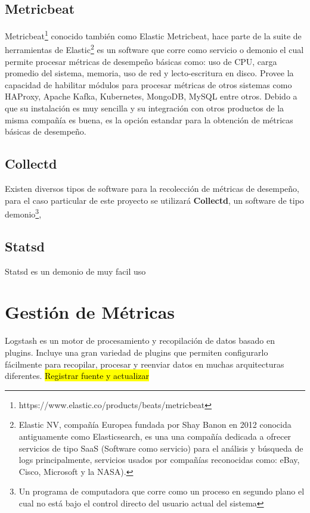 \subsection{Metricbeat}\label{metricbeat}
Metricbeat\footnote[1]{https://www.elastic.co/products/beats/metricbeat} conocido también como Elastic Metricbeat, hace parte de la suite de herramientas de Elastic\footnote[2]{Elastic NV, compañía Europea fundada por Shay Banon en 2012 conocida antiguamente como Elasticsearch, es una una compañía dedicada a ofrecer servicios de tipo SaaS (Software como servicio) para el análisis y búsqueda de logs principalmente, servicios usados por compañías reconocidas como: eBay, Cisco, Microsoft y la NASA).} es un software que corre como servicio o demonio el cual permite procesar métricas de desempeño básicas como: uso de CPU, carga promedio del sistema, memoria, uso de red y lecto-escritura en disco. 
Provee la capacidad de habilitar módulos para procesar métricas de otros sistemas como HAProxy, Apache Kafka, Kubernetes, MongoDB, MySQL entre otros. Debido a que su instalación es muy sencilla y su integración con otros productos de la misma compañía es buena, es la opción estandar para la obtención de métricas básicas de desempeño.



\subsection{Collectd}\label{demonio-collectd}
Existen diversos tipos de software para la recolección de métricas de desempeño, para el caso particular de este proyecto se utilizará \textbf{Collectd}, un software de tipo demonio\footnote[3]{Un programa de computadora que corre como un proceso en segundo plano el cual no está bajo el control directo del usuario actual del sistema}, 

\subsection{Statsd}\label{statsd}
Statsd es un demonio de muy facil uso



\section{Gestión de Métricas}
Logstash es un motor de procesamiento y recopilación de datos basado en plugins. Incluye una gran variedad de plugins que permiten configurarlo fácilmente para recopilar, procesar y reenviar datos en muchas arquitecturas diferentes. \hl{Registrar fuente y actualizar}

